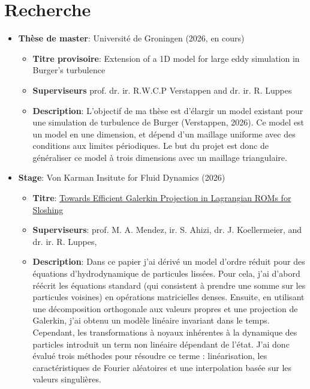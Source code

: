 \documentclass[10pt]{article}
\begin{document}
\section*{ Recherche}
\begin{itemize}
    \item \textbf{Thèse de master}: Université de Groningen (2026, en cours) \begin{itemize}
        \item \textbf{Titre provisoire}: Extension of a 1D model for large eddy simulation in Burger’s turbulence
        \item \textbf{Superviseurs} prof. dr. ir. R.W.C.P Verstappen and dr. ir. R. Luppes 
        \item \textbf{Description}: L'objectif de ma thèse est d'élargir un model existant pour une simulation de turbulence de Burger (Verstappen, 2026). Ce model est un model en une dimension, et dépend d'un maillage uniforme avec des conditions aux limites périodiques. Le but du projet est donc de généraliser ce model à trois dimensions avec un maillage triangulaire. 
    \end{itemize}
    \item \textbf{Stage}: Von Karman Insitute for Fluid Dynamics (2026) \begin{itemize}
        \item \textbf{Titre}: \href{https://fse.studenttheses.ub.rug.nl/37239/1/mAppM2026MandevilleMA.pdf}{Towards Efficient Galerkin Projection in
        Lagrangian ROMs for Sloshing}
        \item \textbf{Superviseurs}: prof. M. A. Mendez, ir. S. Ahizi,  dr. J. Koellermeier, and dr. ir. R.
        Luppes,
        \item \textbf{Description}: Dans ce papier j'ai dérivé un model d'ordre réduit pour des équations d'hydrodynamique de particules lissées. Pour cela, j'ai d'abord réécrit les équations standard (qui consistent à prendre une somme sur les particules voisines) en opérations matricielles denses. Ensuite, en utilisant une décomposition orthogonale aux valeurs propres et une projection de Galerkin, j'ai obtenu un modèle linéaire invariant dans le temps. Cependant, les transformations à noyaux inhérentes à la dynamique des particles introduit un term non linéaire dépendant de l'état. J'ai donc évalué trois méthodes pour résoudre ce terme : linéarisation, les caractéristiques de Fourier aléatoires et une interpolation basée sur les valeurs singulières. 
    \end{itemize}

\end{itemize}
\end{document}
